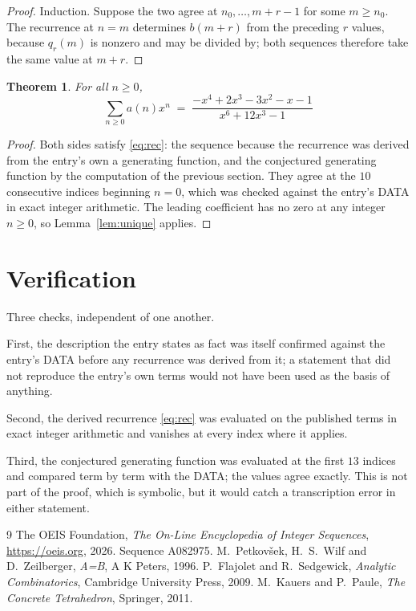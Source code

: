 \documentclass[11pt,a4paper]{article}
\theoremstyle{plain}
\newtheorem{theorem}{Theorem}
\theoremstyle{definition}
\begin{document}
\begin{proof}
Induction. Suppose the two agree at $n_{0},\dots,m+r-1$ for some $m\ge n_{0}$. The
recurrence at $n=m$ determines $b(m+r)$ from the preceding $r$ values, because $q_{r}(m)$
is nonzero and may be divided by; both sequences therefore take the same value at $m+r$.
\end{proof}

\begin{theorem}
For all $n\ge 0$,
\[
\sum_{n\ge 0} a(n)x^{n} \;=\; \frac{- x^{4} + 2 x^{3} - 3 x^{2} - x - 1}{x^{6} + 12 x^{3} - 1}
\]
\end{theorem}

\begin{proof}
Both sides satisfy \eqref{eq:rec}: the sequence because the recurrence was derived from
the entry's own a generating function, and the conjectured generating function by the computation of the
previous section. They agree at the $10$ consecutive indices beginning
$n=0$, which was checked against the entry's DATA in exact integer arithmetic.
The leading coefficient has no zero at any integer $n\ge0$, so
Lemma~\ref{lem:unique} applies.
\end{proof}

\section{Verification}

Three checks, independent of one another.

First, the description the entry states as fact was itself confirmed against the entry's
DATA before any recurrence was derived from it; a statement that did not reproduce the
entry's own terms would not have been used as the basis of anything.

Second, the derived recurrence \eqref{eq:rec} was evaluated on the published terms in
exact integer arithmetic and vanishes at every index where it applies.

Third, the conjectured generating function was evaluated at the first $13$ indices and
compared term by term with the DATA; the values agree exactly. This is not part of the
proof, which is symbolic, but it would catch a transcription error in either statement.

\begin{thebibliography}{9}
 The OEIS Foundation, \emph{The On-Line Encyclopedia of Integer Sequences},
\url{https://oeis.org}, 2026. Sequence A082975.
 M.~Petkov\v{s}ek, H.~S.~Wilf and D.~Zeilberger, \emph{A=B}, A K Peters,
1996.
 P.~Flajolet and R.~Sedgewick, \emph{Analytic Combinatorics}, Cambridge
University Press, 2009.
 M.~Kauers and P.~Paule, \emph{The Concrete Tetrahedron}, Springer, 2011.
\end{thebibliography}
\end{document}
